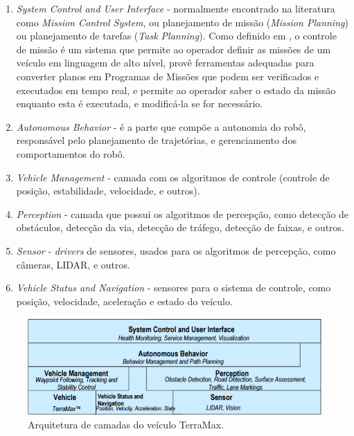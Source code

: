 \begin{enumerate}
  \item \textit{System Control and User Interface} - normalmente encontrado na
  literatura como \textit{Mission Control System}, ou planejamento de
missão (\textit{Mission Planning}) ou planejamento de tarefas (\textit{Task
Planning}). Como definido em \cite{fryxell1996navigation}, o controle de
missão é um sistema que permite ao operador definir as missões de um veículo em
linguagem de alto nível, provê ferramentas adequadas para converter planos em
Programas de Missões que podem ser verificados e executados em tempo real, e
permite ao operador saber o estado da missão enquanto esta é executada, e
modificá-la se for necessário.

  \item \textit{Autonomous Behavior} - é a parte que compõe a autonomia do robô,
  responsável pelo planejamento de trajetórias, e gerenciamento dos
  comportamentos do robô.

  \item \textit{Vehicle Management} - camada com os algoritmos de controle
  (controle de posição, estabilidade, velocidade, e  outros).

  \item \textit{Perception} - camada que possui os algoritmos de percepção, como
  detecção de obstáculos, detecção da via, detecção de tráfego, detecção de
  faixas, e outros.

  \item \textit{Sensor} - \textit{drivers} de sensores, usados para os
  algoritmos de percepção, como câmeras, LIDAR, e outros.

  \item \textit{Vehicle Status and Navigation} - sensores para o sistema de
  controle, como posição, velocidade, aceleração e estado do veículo.
\end{enumerate}

\begin{figure}[!ht]
\centering
\includegraphics[width=\columnwidth]{figs/camadas.jpg}
\caption{Arquitetura de camadas do veículo TerraMax.}
\label{fig:camadas}
\end{figure}

